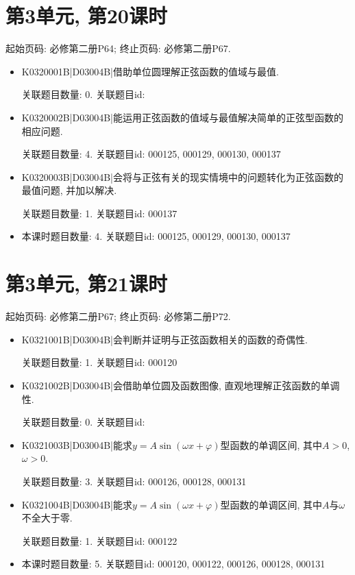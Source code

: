 \section*{第3单元, 第20课时}
起始页码: 必修第二册P64; 终止页码: 必修第二册P67.
\begin{itemize}
\item K0320001B|D03004B|借助单位圆理解正弦函数的值域与最值.

关联题目数量: 0. 关联题目id: 

\item K0320002B|D03004B|能运用正弦函数的值域与最值解决简单的正弦型函数的相应问题.

关联题目数量: 4. 关联题目id: 000125, 000129, 000130, 000137

\item K0320003B|D03004B|会将与正弦有关的现实情境中的问题转化为正弦函数的最值问题, 并加以解决.

关联题目数量: 1. 关联题目id: 000137

\item 本课时题目数量: 4. 关联题目id: 000125, 000129, 000130, 000137

\end{itemize}

\section*{第3单元, 第21课时}
起始页码: 必修第二册P67; 终止页码: 必修第二册P72.
\begin{itemize}
\item K0321001B|D03004B|会判断并证明与正弦函数相关的函数的奇偶性.

关联题目数量: 1. 关联题目id: 000120

\item K0321002B|D03004B|会借助单位圆及函数图像, 直观地理解正弦函数的单调性.

关联题目数量: 0. 关联题目id: 

\item K0321003B|D03004B|能求$y=A\sin(\omega x+\varphi)$型函数的单调区间, 其中$A>0$, $\omega>0$.

关联题目数量: 3. 关联题目id: 000126, 000128, 000131

\item K0321004B|D03004B|能求$y=A\sin(\omega x+\varphi)$型函数的单调区间, 其中$A$与$\omega$不全大于零.

关联题目数量: 1. 关联题目id: 000122

\item 本课时题目数量: 5. 关联题目id: 000120, 000122, 000126, 000128, 000131

\end{itemize}

